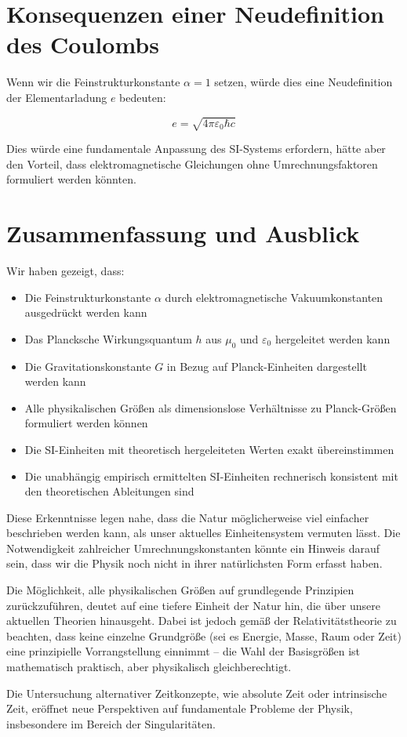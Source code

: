 \documentclass{article}
\begin{document}
	\section{Konsequenzen einer Neudefinition des Coulombs}
	
	Wenn wir die Feinstrukturkonstante $\alpha = 1$ setzen, würde dies eine Neudefinition der Elementarladung $e$ bedeuten:
	
	\begin{equation}
		e = \sqrt{4\pi\varepsilon_0\hbar c}
	\end{equation}
	
	Dies würde eine fundamentale Anpassung des SI-Systems erfordern, hätte aber den Vorteil, dass elektromagnetische Gleichungen ohne Umrechnungsfaktoren formuliert werden könnten.
	
	\section{Zusammenfassung und Ausblick}
	
	Wir haben gezeigt, dass:
	
	\begin{itemize}
		\item Die Feinstrukturkonstante $\alpha$ durch elektromagnetische Vakuumkonstanten ausgedrückt werden kann
		\item Das Plancksche Wirkungsquantum $h$ aus $\mu_0$ und $\varepsilon_0$ hergeleitet werden kann
		\item Die Gravitationskonstante $G$ in Bezug auf Planck-Einheiten dargestellt werden kann
		\item Alle physikalischen Größen als dimensionslose Verhältnisse zu Planck-Größen formuliert werden können
		\item Die SI-Einheiten mit theoretisch hergeleiteten Werten exakt übereinstimmen
		\item Die unabhängig empirisch ermittelten SI-Einheiten rechnerisch konsistent mit den theoretischen Ableitungen sind
	\end{itemize}
	
	Diese Erkenntnisse legen nahe, dass die Natur möglicherweise viel einfacher beschrieben werden kann, als unser aktuelles Einheitensystem vermuten lässt. Die Notwendigkeit zahlreicher Umrechnungskonstanten könnte ein Hinweis darauf sein, dass wir die Physik noch nicht in ihrer natürlichsten Form erfasst haben.
	
	Die Möglichkeit, alle physikalischen Größen auf grundlegende Prinzipien zurückzuführen, deutet auf eine tiefere Einheit der Natur hin, die über unsere aktuellen Theorien hinausgeht. Dabei ist jedoch gemäß der Relativitätstheorie zu beachten, dass keine einzelne Grundgröße (sei es Energie, Masse, Raum oder Zeit) eine prinzipielle Vorrangstellung einnimmt – die Wahl der Basisgrößen ist mathematisch praktisch, aber physikalisch gleichberechtigt.
	
	Die Untersuchung alternativer Zeitkonzepte, wie absolute Zeit oder intrinsische Zeit, eröffnet neue Perspektiven auf fundamentale Probleme der Physik, insbesondere im Bereich der Singularitäten.
	
\end{document}
